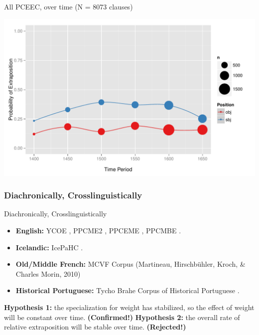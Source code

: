 \documentclass[hyperref={pdfpagelabels=false}]{beamer}
\begin{document}


\begin{frame}{All PCEEC, over time (N = 8073 clauses)}

\begin{center}
\includegraphics[width=1.1\textwidth]{exSbjObjYearBinned50.pdf}
\end{center}
\end{frame}


\subsubsection{Diachronically, Crosslinguistically}

\begin{frame}{Diachronically, Crosslinguistically}
\begin{itemize}
	\item \textbf{English:} YCOE \citep{ycoe}, PPCME2 \citep{ppcme2}, PPCEME \citep{ppceme}, PPCMBE \citep{ppcmbe}.
	\item \textbf{Icelandic:} IcePaHC \citep{icepahc09}.
	\item \textbf{Old/Middle French:} MCVF Corpus (Martineau, Hirschbühler, Kroch, \& Charles Morin, 2010) \nocite{mcvf}
	\item \textbf{Historical Portuguese:} Tycho Brahe Corpus of Historical Portuguese \citep{tychobrahe}.
	\end{itemize}
	\textbf{Hypothesis 1:} the specialization for weight has stabilized, so the effect of weight will be constant over time. \textbf{(Confirmed!)}
	\textbf{Hypothesis 2:} the overall rate of relative extraposition will be stable over time. \textbf{(Rejected!)}

\end{frame}
\end{document}
